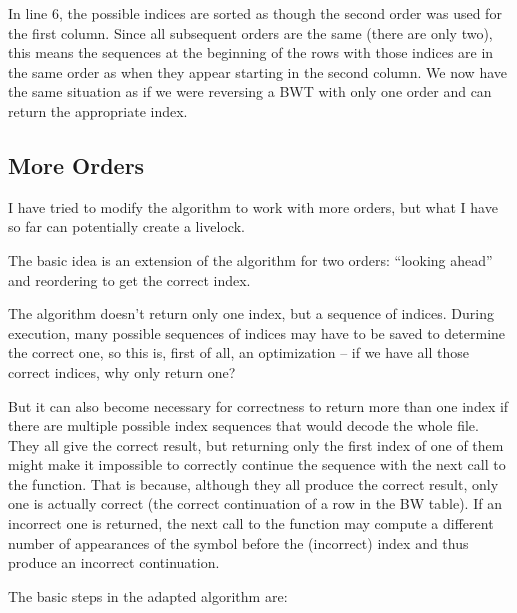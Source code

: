 \documentclass[a4paper]{scrreprt}
\begin{document}
In line 6, the possible indices are sorted as though the second order was used
for the first column. Since all subsequent orders are the same (there are only
two), this means the sequences at the beginning of the rows with those indices
are in the same order as when they appear starting in the second column. We now
have the same situation as if we were reversing a BWT with only one order and
can return the appropriate index.

\subsection{More Orders}

I have tried to modify the algorithm to work with more orders, but what I have
so far can potentially create a livelock.

The basic idea is an extension of the algorithm for two orders: ``looking
ahead'' and reordering to get the correct index.

The algorithm doesn't return only one index, but a sequence of indices.
During execution, many possible sequences of indices may have to be saved to
determine the correct one, so this is, first of all, an optimization -- if we
have all those correct indices, why only return one?

But it can also become
necessary for correctness to return more than one index if there are multiple
possible index sequences that would decode the whole file. They all give the
correct result, but returning only the first index of one of them might make it
impossible to correctly continue the sequence with the next call to the
function. That is because, although they all produce the correct result, only
one is actually correct (the correct continuation of a row in the BW table). If
an incorrect one is returned, the next call to the function may compute a
different number of appearances of the symbol before the (incorrect) index and
thus produce an incorrect continuation.

The basic steps in the adapted algorithm are:
\end{document}

